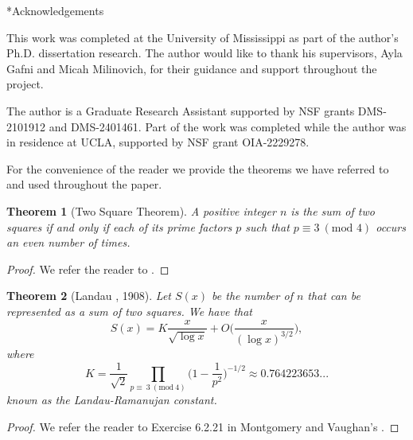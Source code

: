 \documentclass[12pt,reqno]{amsart}
\makeatletter
\def\section{\@startsection{section}{1}
  \z@{.7\linespacing\@plus\linespacing}{.5\linespacing}
  {\normalfont\scshape\bfseries}}
\newtheorem{theorem}{Theorem}[section]
\newcommand{\Mod}[1]{\ (\mathrm{mod}\ #1)}
\makeatother
\begin{document}
\section*{Acknowledgements}

This work was completed at the University of Mississippi as part of the author’s Ph.D. dissertation research. The author would like to thank his supervisors, Ayla Gafni and Micah Milinovich, for their guidance and support throughout the project.

The author is a Graduate Research Assistant supported by NSF grants DMS-2101912 and DMS-2401461. Part of the work was completed while the author was in residence at UCLA, supported by NSF grant OIA-2229278.

\appendix 
\section{}\label{appendix}

For the convenience of the reader we provide the theorems we have referred to and used throughout  the paper.


\begin{theorem}[Two Square Theorem] \label{tst}
    A positive integer $n$ is the sum of two squares if and only if each of its prime factors $p$ such that $p\equiv 3 \ (\text{mod } 4)$ occurs an even number of times.
\end{theorem}

\begin{proof}
    We refer the reader to \cite{underwood}.
\end{proof}

\begin{theorem}[Landau \cite{L}, 1908] \label{Landau}
Let $S(x)$ be the number of $n$ that can be represented as a sum of two squares. We have that
    \begin{equation*}
        S(x)= K\frac{x}{\sqrt{\log x}}+O\Bigg(\frac{x}{(\log x)^{3/2}}\Bigg),
    \end{equation*}
        where 
    \begin{equation*}
        K=\frac{1}{\sqrt{2}}\prod_{p \equiv \ 3 \Mod 4} \Big(1-\frac{1}{p^2}\Big)^{-1/2} \approx 0.764223653...
            \end{equation*}
    known as the Landau-Ramanujan constant.
\end{theorem}

\begin{proof}
    We refer the reader to Exercise 6.2.21 in Montgomery and Vaughan's \cite{MV}.
\end{proof}
\end{document}
